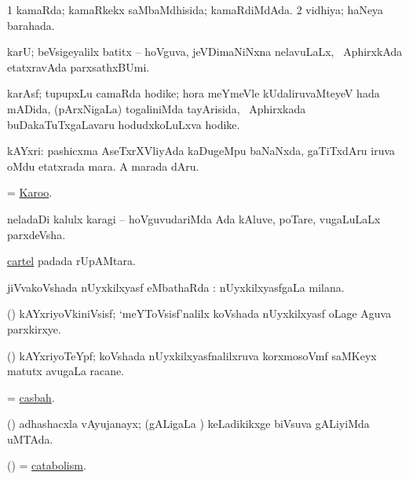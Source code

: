\bentry
{}
\gl{\gu}
\bmng
\bnum
\num{1} kamaRda; kamaRkekx saMbaMdhisida; kamaRdiMdAda. 
\num{2} vidhiya; haNeya barahada. 
\enum
\emng
\eentry

\bentry
{}
\gl{\nA}
\bmng
karU; beVsigeyalilx batitx -- hoVguva, jeVDimaNiNxna nelavuLaLx, \da\ AphirxkAda etatxravAda parxsathxBUmi. 
\emng
\eentry

\bentry
{}
\gl{\nA}
\bmng
karAsf; tupupxLu camaRda hodike; hora meYmeVle kUdaliruvaMteyeV hada mADida, (pArxNigaLa) togaliniMda tayArisida, \da\ Aphirxkada buDakaTuTxgaLavaru hodudxkoLuLxva hodike. 
\emng
\eentry

\bentry
{}
\gl{\nA}
\bmng
kAYxri: 
\banum
{} pashicxma AseTxrXVliyAda kaDugeMpu baNaNxda, gaTiTxdAru iruva oMdu etatxrada mara. 
 A marada dAru. 
\eanum
\emng
\eentry

\bentry
{}
\gl{\nA}
\bmng
 = \hyperlink{Karoo}{Karoo}. 
\emng
\eentry

\bentry
{}
\gl{\nA}
\bmng
neladaDi kalulx karagi -- hoVguvudariMda Ada kAluve, poTare, \mo vugaLuLaLx parxdeVsha. 
\emng
\eentry

\bentry
{}
\gl{\nA}
\bmng
\hyperref{kandict_c.pdf}{C}{cartel}{cartel} padada rUpAMtara. 
\emng
\eentry

\bentry
{}
\gl{\sapUpa}
\bmng
jiVvakoVshada nUyxkilxyasf eMbathaRda \sapUpa:  nUyxkilxyasfgaLa milana. 
\emng
\eentry

\bentry
{}
\gl{\nA}
\bmng
(\jiVvi) kAYxriyoVkiniVsisf; `meYToVsisf'nalilx koVshada nUyxkilxyasf oLage Aguva parxkirxye. 
\emng
\eentry

\bentry
{}
\gl{\nA}
\bmng
(\jiVvi) kAYxriyoTeYpf; koVshada nUyxkilxyasfnalilxruva korxmosoVmf saMKeyx matutx avugaLa racane. 
\emng
\eentry

\bentry
{}
\gl{\nA}
\bmng
= \hyperref{kandict_c.pdf}{C}{casbah}{casbah}. 
\emng
\eentry

\bentry
{}
\gl{\gu}
\bmng
(\pashA) adhashacxla vAyujanayx; (gALigaLa \vi) keLadikikxge biVsuva gALiyiMda uMTAda. 
\emng
\eentry

\bentry
{}
\gl{\nA}
\bmng
(\jiVvi) = \hyperref{kandict_c.pdf}{C}{catabolism}{catabolism}. 
\emng
\eentry

